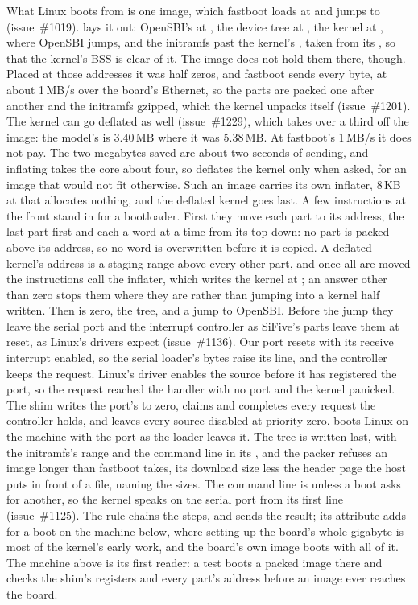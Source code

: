 \documentclass[journal,onecolumn,9pt]{IEEEtran}
\begin{document}
What Linux boots from is one image, which fastboot loads at
 and jumps to (issue~\#1019). 
lays it out: OpenSBI's  at , the
device tree at , the kernel at ,
where OpenSBI jumps, and the initramfs past the kernel's ,
taken from its , so that the kernel's BSS is clear of
it. The image does not hold them there, though. Placed at those
addresses it was half zeros, and fastboot sends every byte, at about
1\,MB/s over the board's Ethernet, so the parts are packed one after
another and the initramfs
gzipped, which the kernel unpacks itself (issue~\#1201). The kernel
can go deflated as well (issue~\#1229), which takes over a third off
the image: the model's is 3.40\,MB where it was 5.38\,MB. At
fastboot's 1\,MB/s it does not pay. The two megabytes saved are about two seconds
of sending, and inflating takes the core about four, so
 deflates the kernel only when asked, for an image
that would not fit otherwise. Such an image carries its own inflater,
8\,KB at  that allocates nothing, and the deflated
kernel goes last. A few
instructions at the front stand in for a bootloader. First they move
each part to its address, the last part first and each a word at a
time from its top down: no part is packed above its address, so no
word is overwritten before it is copied. A deflated kernel's address
is a staging range above every other part, and once all are moved
the instructions call the inflater, which writes the kernel at
; an answer other than zero stops them where they
are rather than jumping into a kernel half written. Then  is zero,
 the tree, and a jump to OpenSBI. Before the jump
they leave the serial port and the interrupt controller as SiFive's
parts leave them at reset, as Linux's drivers expect
(issue~\#1136). Our port resets with its receive interrupt enabled,
so the serial loader's bytes raise its line, and the controller keeps
the request. Linux's driver enables the source before it has
registered the port, so the request reached the handler with no port
and the kernel panicked. The shim writes the port's  to zero,
claims and completes every request the controller holds, and leaves
every source disabled at priority zero. 
boots Linux on the machine with the port as the loader leaves it. The
tree is
written last, with the initramfs's range and the command line in its
, and the packer refuses an image longer than fastboot
takes, its download size less the header page the host puts in front
of a file, naming the sizes. The command line is
 unless a boot asks for another, so the
kernel speaks on the serial port from its first line (issue~\#1125).
The rule  chains the steps, and
 sends the result; its 
attribute adds  for a boot on the machine below, where
setting up the board's whole gigabyte is most of the kernel's early
work, and the board's own image boots with all of it. The
machine above is its first reader: a test boots a packed image there
and checks the shim's registers and every part's address before an
image ever reaches the board.
\end{document}
